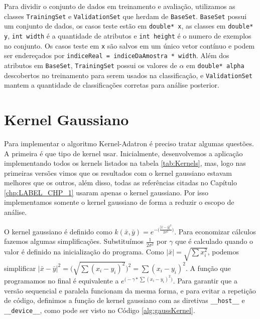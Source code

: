 Para dividir o conjunto de dados em treinamento e avaliação, utilizamos as classes \texttt{TrainingSet} e \texttt{ValidationSet} que herdam de \texttt{BaseSet}. \texttt{BaseSet} possui um conjunto de dados, os casos teste estão em \texttt{double* x}, as classes em \texttt{double* y}, \texttt{int width} é a quantidade de atributos e \texttt{int height} é o numero de exemplos no conjunto. %
Os casos teste em \texttt{x} são salvos em um único vetor contínuo e podem ser endereçados por \texttt{indiceReal = indiceDaAmostra * width}.
Além dos atributos em \texttt{BaseSet}, \texttt{TrainingSet} possui os valores de $\alpha$ em \texttt{double* alpha} descobertos no treinamento para serem usados na classificação, e \texttt{ValidationSet} mantem a quantidade de classificações corretas para análise posterior.

\section{Kernel Gaussiano}
Para implementar o algoritmo Kernel-Adatron é preciso tratar algumas questões. A primeira é que tipo de kernel usar. Inicialmente, desenvolvemos a aplicação implementando todos os kernels listados na tabela \ref{tab:Kernels}, mas, logo nas primeiras versões vimos que os resultados com o kernel gaussiano estavam melhores que os outros, além disso, todas as referências citadas no Capítulo \ref{chp:LABEL_CHP_1} usaram apenas o kernel gaussiano. Por isso implementamos somente o kernel gaussiano de forma a reduzir o escopo de análise.

O kernel gaussiano é definido como $k(\bar{x},\bar{y}) = e^{-\big( \frac{|\bar{x}-\bar{y}|^2} {2\sigma^2}\big)}$. Para economizar cálculos fazemos algumas simplificações. Substituímos $\frac{1}{2\sigma^2}$ por $\gamma$ que é calculado quando o valor é definido na inicialização do programa. Como $|\bar{x}| = \sqrt{\sum x_i^2}$, podemos simplificar $|\bar{x}-\bar{y}|^2 = \bigg(\sqrt{\sum (x_i-y_i)^2}\bigg)^2=\sum (x_i-y_i)^2$. A função que programamos no final é equivalente a $e^{\big(-\gamma*\sum (x_i-y_i)^2\big)}$.
Para garantir que a versão sequencial e paralela funcionam da mesma forma, e para evitar a repetição de código, definimos a função de kernel gaussiano com as diretivas \texttt{\_\_host\_\_} e \texttt{\_\_device\_\_}, como pode ser visto no Código \ref{alg:gaussKernel}.


